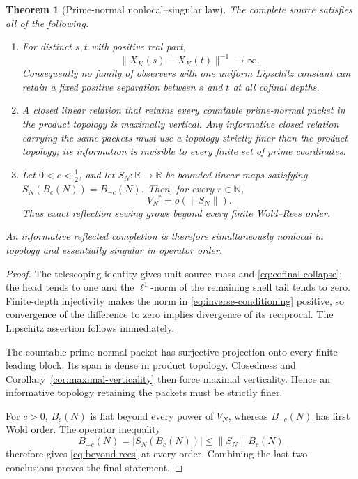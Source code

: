 \documentclass[11pt]{article}
\newtheorem{theorem}{Theorem}[section]
\theoremstyle{definition}
\theoremstyle{remark}
\newcommand{\R}{\mathbb R}
\newcommand{\N}{\mathbb N}
\begin{document}
\begin{theorem}[Prime-normal nonlocal--singular law]
\label{thm:nonlocal-singular}
The complete source satisfies all of the following.
\begin{enumerate}[label=\textup{(\roman*)},leftmargin=2.2em]
\item For distinct \(s,t\) with positive real part,
      \[
        \|X_K(s)-X_K(t)\|^{-1}\longrightarrow\infty.
      \tag{4.6}\label{eq:inverse-conditioning}
      \]
      Consequently no family of observers with one uniform Lipschitz
      constant can retain a fixed positive separation between \(s\) and
      \(t\) at all cofinal depths.
\item A closed linear relation that retains every countable prime-normal
      packet in the product topology is maximally vertical.  Any informative
      closed relation carrying the same packets must use a topology strictly
      finer than the product topology; its information is invisible to every
      finite set of prime coordinates.
\item Let \(0<c<\tfrac12\), and let
      \(S_N:\R\to\R\) be bounded linear maps satisfying
      \(S_N(B_c(N))=B_{-c}(N)\).  Then, for every \(r\in\N\),
      \[
                  V_N^{-r}=o(\|S_N\|).
      \tag{4.7}\label{eq:beyond-rees}
      \]
      Thus exact reflection sewing grows beyond every finite Wold--Rees
      order.
\end{enumerate}
An informative reflected completion is therefore simultaneously nonlocal in
topology and essentially singular in operator order.
\end{theorem}

\begin{proof}
The telescoping identity gives unit source mass and
\eqref{eq:cofinal-collapse}; the head tends to one and the \(\ell^1\)-norm
of the remaining shell tail tends to zero.  Finite-depth injectivity makes
the norm in \eqref{eq:inverse-conditioning} positive, so convergence of the
difference to zero implies divergence of its reciprocal.  The Lipschitz
assertion follows immediately.

The countable prime-normal packet has surjective projection onto every
finite leading block.  Its span is dense in product topology.  Closedness
and Corollary~\ref{cor:maximal-verticality} then force maximal verticality.
Hence an informative topology retaining the packets must be strictly finer.

For \(c>0\), \(B_c(N)\) is flat beyond every power of \(V_N\), whereas
\(B_{-c}(N)\) has first Wold order.  The operator inequality
\[
              B_{-c}(N)=|S_N(B_c(N))|
                 \le \|S_N\|B_c(N)
\]
therefore gives \eqref{eq:beyond-rees} at every order.  Combining the last
two conclusions proves the final statement.
\end{proof}
\end{document}
